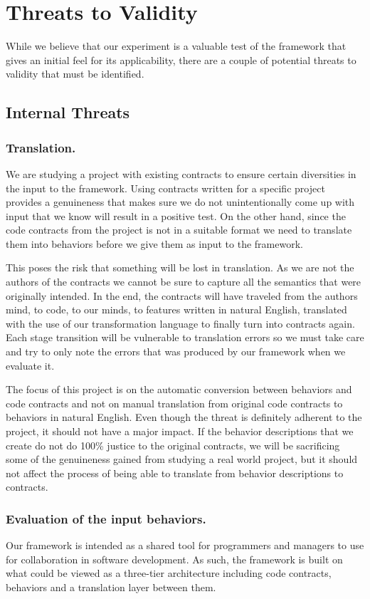 \section{Threats to Validity}
\label{sec:Threats}
While we believe that our experiment is a valuable test of the framework that gives an initial feel for its applicability, there are a couple of potential threats to validity that must be identified.

\subsection{Internal Threats}
\subsubsection{Translation.}
We are studying a project with existing contracts to ensure certain diversities in the input to the framework.
Using contracts written for a specific project provides a genuineness that makes sure we do not unintentionally come up with input that we know will result in a positive test.
On the other hand, since the code contracts from the project is not in a suitable format we need to translate them into behaviors before we give them as input to the framework.
 
This poses the risk that something will be lost in translation.
As we are not the authors of the contracts we cannot be sure to capture all the semantics that were originally intended.
In the end, the contracts will have traveled from the authors mind, to code, to our minds, to features written in natural English, translated with the use of our transformation language to finally turn into contracts again.
Each stage transition will be vulnerable to translation errors so we must take care and try to only note the errors that was produced by our framework when we evaluate it.
 
The focus of this project is on the automatic conversion between behaviors and code contracts and not on manual translation from original code contracts to behaviors in natural English. Even though the threat is definitely adherent to the project, it should not have a major impact.
If the behavior descriptions that we create do not do 100\%  justice to the original contracts, we will be sacrificing some of the genuineness gained from studying a real world project, but it should not affect the process of being able to translate from behavior descriptions to contracts.

\subsubsection{Evaluation of the input behaviors.}
Our framework is intended as a shared tool for programmers and managers to use for collaboration in software development.
As such, the framework is built on what could be viewed as a three-tier architecture including code contracts, behaviors and a translation layer between them.
 

